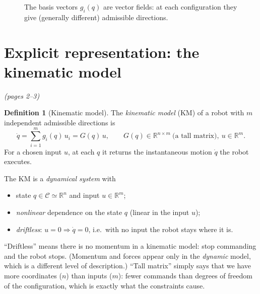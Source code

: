 \documentclass[11pt,a4paper]{article}
\newcommand{\R}{\mathbb{R}}
\newcommand{\dq}{\dot q}
\theoremstyle{definition}
\newtheorem{definition}{Definition}[section]
\theoremstyle{plain}
\theoremstyle{remark}
\begin{document}
\begin{figure}[h]
\centering
{}
\caption{The basis vectors $g_i(q)$ are vector fields: at each configuration they give (generally different) admissible directions.}
\end{figure}

\section{Explicit representation: the kinematic model}\emph{(pages 2--3)}

\begin{definition}[Kinematic model]\label{def:km}
The \emph{kinematic model} (KM) of a robot with $m$ independent admissible directions is
\[
\dq=\sum_{i=1}^{m} g_i(q)\,u_i = G(q)\,u,\qquad G(q)\in\R^{n\times m}\ \text{(a tall matrix)},\ u\in\R^m .
\]
For a chosen input $u$, at each $q$ it returns the instantaneous motion $\dq$ the robot executes.
\end{definition}

The KM is a \emph{dynamical system} with
\begin{itemize}[nosep]
\item state $q\in\mathcal{C}\simeq\R^n$ and input $u\in\R^m$;
\item \emph{nonlinear} dependence on the state $q$ (linear in the input $u$);
\item \emph{driftless}: $u=0\Rightarrow \dq=0$, i.e.\ with no input the robot stays where it is.
\end{itemize}

\begin{intuition}
``Driftless'' means there is no momentum in a kinematic model: stop commanding and the robot stops. (Momentum and forces appear only in the \emph{dynamic} model, which is a different level of description.) ``Tall matrix'' simply says that we have more coordinates ($n$) than inputs ($m$): fewer commands than degrees of freedom of the configuration, which is exactly what the constraints cause.
\end{intuition}
\end{document}
